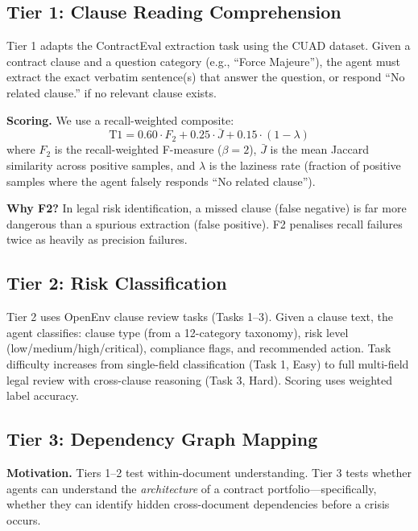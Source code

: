 \documentclass[11pt]{article}
\begin{document}
\subsection{Tier 1: Clause Reading Comprehension}

Tier 1 adapts the ContractEval extraction task \citep{contracteval2024} using the CUAD dataset. Given a contract clause and a question category (e.g., ``Force Majeure''), the agent must extract the exact verbatim sentence(s) that answer the question, or respond ``No related clause.'' if no relevant clause exists.

\textbf{Scoring.} We use a recall-weighted composite:
\begin{equation}
\text{T1} = 0.60 \cdot F_2 + 0.25 \cdot \bar{J} + 0.15 \cdot (1 - \lambda)
\end{equation}
where $F_2$ is the recall-weighted F-measure \citep{manning2008ir} ($\beta=2$), $\bar{J}$ is the mean Jaccard similarity across positive samples, and $\lambda$ is the laziness rate (fraction of positive samples where the agent falsely responds ``No related clause'').

\textbf{Why F2?} In legal risk identification, a missed clause (false negative) is far more dangerous than a spurious extraction (false positive). F2 penalises recall failures twice as heavily as precision failures.

\subsection{Tier 2: Risk Classification}

Tier 2 uses OpenEnv clause review tasks (Tasks 1--3). Given a clause text, the agent classifies: clause type (from a 12-category taxonomy), risk level (low/medium/high/critical), compliance flags, and recommended action. Task difficulty increases from single-field classification (Task 1, Easy) to full multi-field legal review with cross-clause reasoning (Task 3, Hard). Scoring uses weighted label accuracy.

\subsection{Tier 3: Dependency Graph Mapping}

\textbf{Motivation.} Tiers 1--2 test within-document understanding. Tier 3 tests whether agents can understand the \emph{architecture} of a contract portfolio---specifically, whether they can identify hidden cross-document dependencies before a crisis occurs.
\end{document}
